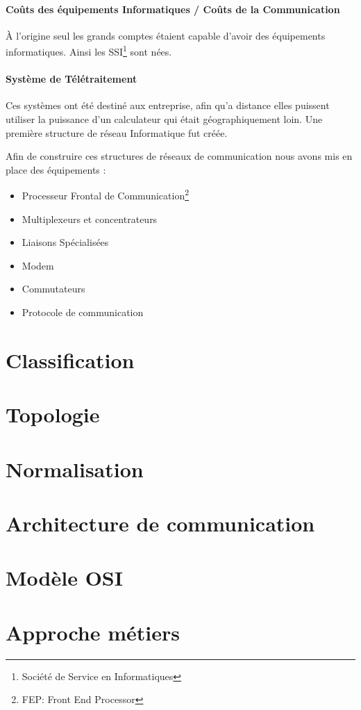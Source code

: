 \documentclass[12pt,a4paper,openany]{article}
\begin{document}
			\paragraph{Coûts des équipements Informatiques / Coûts de la Communication} À l'origine seul les grands comptes étaient capable d'avoir des équipements informatiques. Ainsi les SSI\footnote{Société de Service en Informatiques} sont nées.
			\paragraph{Système de Télétraitement} Ces systèmes ont été destiné aux entreprise, afin qu'a distance elles puissent utiliser la puissance d'un calculateur qui était géographiquement loin. Une première structure de réseau Informatique fut créée.

			Afin de construire ces structures de réseaux de communication nous avons mis en place des équipements :
			\begin{itemize}
				\item Processeur Frontal de Communication\footnote{FEP: Front End Processor}
				\item Multiplexeurs et concentrateurs
				\item Liaisons Spécialisées
				\item Modem
				\item Commutateurs
				\item Protocole de communication
			\end{itemize}
	\section{Classification}
	\section{Topologie}
	\section{Normalisation}
	\section{Architecture de communication}
	\section{Modèle OSI}
	\section{Approche métiers}
\end{document}
